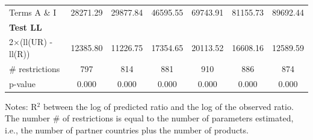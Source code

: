 \documentclass[a4paper,11pt]{article}
\begin{document}
\begin{table}[htbp]
\begin{center}
{\begin{tabular}{l|cccccc}
Terms A \& I & 28271.29 & 29877.84 & \multicolumn{1}{c}{46595.55} & \multicolumn{1}{c}{69743.91} & \multicolumn{1}{c}{81155.73} & \multicolumn{1}{c}{89692.44} \\
\textbf{Test LL} &       &       & & &  & \\
2$\times$(ll(UR) -ll(R)) & 12385.80 & 11226.75 & \multicolumn{1}{c}{17354.65} & \multicolumn{1}{c}{20113.52} & \multicolumn{1}{c}{16608.16} & \multicolumn{1}{c}{12589.59} \\
\# restrictions  & 797   & 814   & \multicolumn{1}{c}{881} & \multicolumn{1}{c}{910} & \multicolumn{1}{c}{886} & \multicolumn{1}{c}{874} \\
p-value & 0.000 & 0.000 & \multicolumn{1}{c}{0.000} & \multicolumn{1}{c}{0.000} & \multicolumn{1}{c}{0.000} & \multicolumn{1}{c}{0.000} \\
\hline\hline
\end{tabular}}
\end{center}
  \vspace{-10pt}\tiny{Notes: R$^{2}$ between the log of predicted ratio and the log of the observed ratio. The number \# of restrictions is equal to the number of parameters estimated, i.e., the number of partner countries plus the number of products.}
\end{table}%
\end{document}
